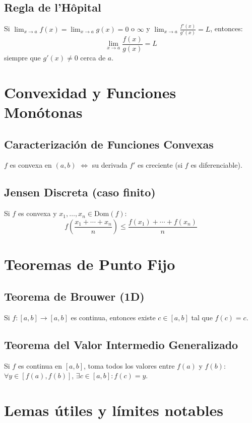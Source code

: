 \documentclass[12pt]{article}
\begin{document}
\subsection{Regla de l'Hôpital}
Si $\lim_{x \to a} f(x) = \lim_{x \to a} g(x) = 0$ o $\infty$ y $\lim_{x \to a} \frac{f'(x)}{g'(x)} = L$, entonces:
\[
\lim_{x \to a} \frac{f(x)}{g(x)} = L
\]
siempre que $g'(x) \neq 0$ cerca de $a$.

\section{Convexidad y Funciones Monótonas}

\subsection{Caracterización de Funciones Convexas}
$f$ es convexa en $(a,b)$ $\Leftrightarrow$ su derivada $f'$ es creciente (si $f$ es diferenciable).

\subsection{Jensen Discreta (caso finito)}
Si $f$ es convexa y $x_1, \dots, x_n \in \text{Dom}(f)$:
\[
f\left( \frac{x_1 + \cdots + x_n}{n} \right) \leq \frac{f(x_1) + \cdots + f(x_n)}{n}
\]

\section{Teoremas de Punto Fijo}

\subsection{Teorema de Brouwer (1D)}
Si $f: [a,b] \to [a,b]$ es continua, entonces existe $c \in [a,b]$ tal que $f(c) = c$.

\subsection{Teorema del Valor Intermedio Generalizado}
Si $f$ es continua en $[a,b]$, toma todos los valores entre $f(a)$ y $f(b)$: $\forall y \in [f(a),f(b)]$, $\exists c \in [a,b]: f(c) = y$.

\section{Lemas útiles y límites notables}
\end{document}
